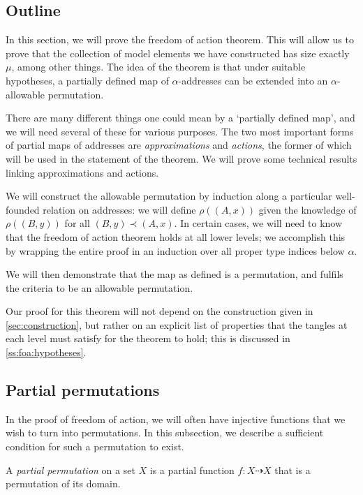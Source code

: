 \subsection{Outline}
\label{ss:foa:outline}

In this section, we will prove the freedom of action theorem.
This will allow us to prove that the collection of model elements we have constructed has size exactly \( \mu \), among other things.
The idea of the theorem is that under suitable hypotheses, a partially defined map of \( \alpha \)-addresses can be extended into an \( \alpha \)-allowable permutation.

There are many different things one could mean by a `partially defined map', and we will need several of these for various purposes.
The two most important forms of partial maps of addresses are \emph{approximations} and \emph{actions}, the former of which will be used in the statement of the theorem.
We will prove some technical results linking approximations and actions.

We will construct the allowable permutation by induction along a particular well-founded relation on addresses: we will define \( \rho((A, x)) \) given the knowledge of \( \rho((B, y)) \) for all \( (B, y) \prec (A, x) \).
In certain cases, we will need to know that the freedom of action theorem holds at all lower levels; we accomplish this by wrapping the entire proof in an induction over all proper type indices below \( \alpha \).

We will then demonstrate that the map as defined is a permutation, and fulfils the criteria to be an allowable permutation.

Our proof for this theorem will not depend on the construction given in \cref{sec:construction}, but rather on an explicit list of properties that the tangles at each level must satisfy for the theorem to hold; this is discussed in \cref{ss:foa:hypotheses}.

\subsection{Partial permutations}

In the proof of freedom of action, we will often have injective functions that we wish to turn into permutations.
In this subsection, we describe a sufficient condition for such a permutation to exist.

\begin{definition}
    A \emph{partial permutation} on a set \( X \) is a partial function \( f : X \rightdasharrow X \) that is a permutation of its domain.
\end{definition}

